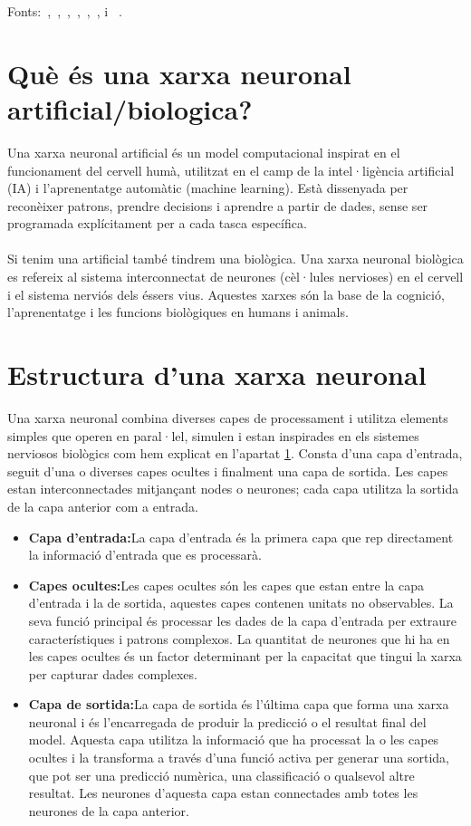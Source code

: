 Fonts:~\cite{Universitat_oberta_catalunya},~\cite{Generalitat},~\cite{IBM_machine_learning},~\cite{Ultralytics},~\cite{bengio2012},~\cite{Ai_Act}, \cite{Algorismes} i ~\cite{Unesco}.

\section{Què és una xarxa neuronal artificial/biologica?}\label{sec:xarxa neuronal}
Una xarxa neuronal artificial és un model computacional inspirat en el funcionament del cervell humà, utilitzat en el camp de la intel·ligència artificial (IA) i l'aprenentatge automàtic (machine learning). Està dissenyada per reconèixer patrons, prendre decisions i aprendre a partir de dades, sense ser programada explícitament per a cada tasca específica.\\ \\
Si tenim una artificial també tindrem una biològica. Una xarxa neuronal biològica es refereix al sistema interconnectat de neurones (cèl·lules nervioses) en el cervell i el sistema nerviós dels éssers vius. Aquestes xarxes són la base de la cognició, l'aprenentatge i les funcions biològiques en humans i animals.\\


\section{Estructura d'una xarxa neuronal}\label{sec:3.6}
Una xarxa neuronal combina diverses capes de processament i utilitza elements simples que operen en paral·lel, simulen i estan inspirades en els sistemes nerviosos biològics com hem explicat en l'apartat \ref{sec:xarxa neuronal}. Consta d'una capa d'entrada, seguit d'una o diverses capes ocultes i finalment una capa de sortida. Les capes estan interconnectades mitjançant nodes o neurones; cada capa utilitza la sortida de la capa anterior com a entrada.

\begin{itemize}
 \item \textbf{Capa d'entrada:}La capa d'entrada és la primera capa que rep directament la informació d'entrada que es processarà.
 \item \textbf{Capes ocultes:}Les capes ocultes són les capes que estan entre la capa d'entrada i la de sortida, aquestes capes contenen unitats no observables. La seva funció principal és processar les dades de la capa d'entrada per extraure característiques i patrons complexos.  La quantitat de neurones que hi ha en les capes ocultes és un factor determinant per la capacitat que tingui la xarxa per capturar dades complexes.
 \item \textbf{Capa de sortida:}La capa de sortida és l'última capa que forma una xarxa neuronal i és l'encarregada de produir la predicció o el resultat final del model. Aquesta capa utilitza la informació que ha processat la o les capes ocultes i la transforma a través d'una funció activa per generar una sortida, que pot ser una predicció numèrica, una classificació o qualsevol altre resultat. Les neurones d'aquesta capa estan connectades amb totes les neurones de la capa anterior.
 \end{itemize}



